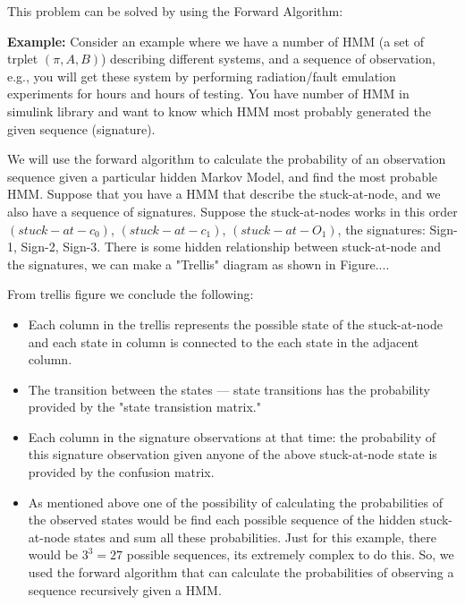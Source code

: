 This problem can be solved by using the Forward Algorithm:

\textbf{Example:} Consider an example where we have a number of HMM (a set of trplet $(\pi, A, B)$) describing different systems, and a sequence of observation, e.g., you will get these system by performing radiation/fault emulation experiments for hours and hours of testing. You have number of HMM in simulink library and want to know which HMM most probably generated the given sequence (signature).


We will use the forward algorithm to calculate the probability of an observation sequence given a particular hidden Markov Model, and find the most probable HMM. Suppose that you have a HMM that describe the stuck-at-node, and we also have a sequence of signatures. Suppose the stuck-at-nodes works in this order $(stuck-at-c_0)$, $(stuck-at-c_1)$, $(stuck-at-O_1)$, the signatures: Sign-1, Sign-2, Sign-3. There is some hidden relationship between stuck-at-node and the signatures, we can make a "Trellis" diagram as shown in Figure....


From trellis figure we conclude the following:

\begin{itemize}

\item Each column in the trellis represents the possible state of the stuck-at-node and each state in column is connected to the each state in the adjacent column.

\item The transition between the states --- state transitions has the probability provided by the "state transistion matrix."

\item Each column in the signature observations at that time: the probability of this signature observation given anyone of the above stuck-at-node state is provided by the confusion matrix. 

\item As mentioned above one of the possibility of calculating the probabilities of the observed states would be find each possible sequence of the hidden stuck-at-node states and sum all these probabilities. Just for this example, there would be $3^3 = 27$ possible sequences, its extremely complex to do this. So, we used the forward algorithm that can calculate the probabilities of observing a sequence recursively given a HMM.

\end{itemize}

